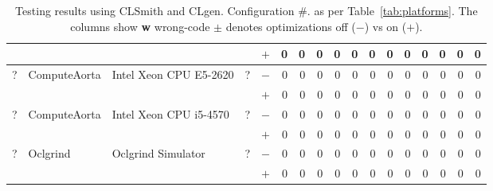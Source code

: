 \begin{table*}[t!]
\begin{tabular}{lllll | rrrrrr | rrrrrr }
	& & & & $+$ & 0 & 0 & 0 & 0 & 0 & 0 & 0 & 0 & 0 & 0 & 0 & 0 \\
	\hline
	\multirow{ 2}{*}{?} & \multirow{ 2}{*}{ComputeAorta} & \multirow{ 2}{*}{Intel Xeon CPU E5-2620} & \multirow{ 2}{*}{?} & $-$ & 0 & 0 & 0 & 0 & 0 & 0 & 0 & 0 & 0 & 0 & 0 & 0 \\
	& & & & $+$ & 0 & 0 & 0 & 0 & 0 & 0 & 0 & 0 & 0 & 0 & 0 & 0 \\
	\hline
	\multirow{ 2}{*}{?} & \multirow{ 2}{*}{ComputeAorta} & \multirow{ 2}{*}{Intel Xeon CPU i5-4570} & \multirow{ 2}{*}{?} & $-$ & 0 & 0 & 0 & 0 & 0 & 0 & 0 & 0 & 0 & 0 & 0 & 0 \\
	& & & & $+$ & 0 & 0 & 0 & 0 & 0 & 0 & 0 & 0 & 0 & 0 & 0 & 0 \\
	\hline
	\multirow{ 2}{*}{?} & \multirow{ 2}{*}{Oclgrind} & \multirow{ 2}{*}{Oclgrind Simulator} & \multirow{ 2}{*}{?} & $-$ & 0 & 0 & 0 & 0 & 0 & 0 & 0 & 0 & 0 & 0 & 0 & 0 \\
	& & & & $+$ & 0 & 0 & 0 & 0 & 0 & 0 & 0 & 0 & 0 & 0 & 0 & 0 \\
    \bottomrule
  \end{tabular}
  \caption{Testing results using CLSmith and CLgen. Configuration \#. as per Table~\ref{tab:platforms}. The columns show \textbf{w} wrong-code $\pm$ denotes optimizations off ($-$) vs on ($+$).}
  \label{tab:results}
\end{table*}

